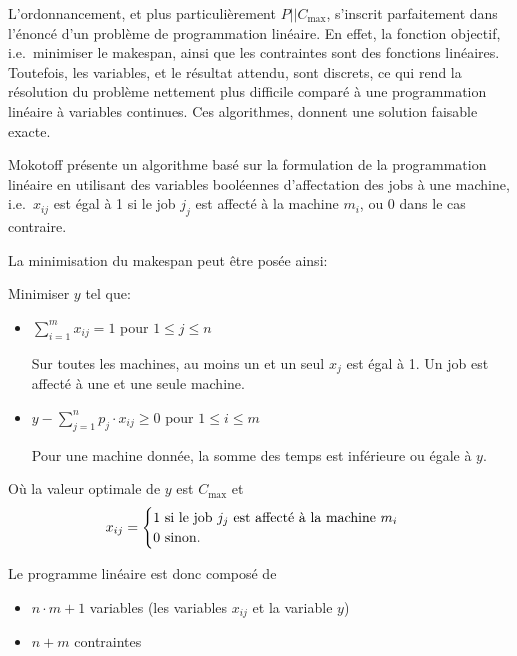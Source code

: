 \documentclass[a4paper,12pt]{report}
\theoremstyle{plain}				%
\theoremstyle{definition}				%
\newcommand\problemGrahamP{$P||C_{\max}$\xspace}
\newcommand{\tdi}[1]{\todo[inline]{{#1}}{}}
\newcommand{\lp}[1]{\todo[author=LP,color=yellow,inline]{#1}}
\begin{document}
L'ordonnancement, et plus particulièrement \problemGrahamP, s'inscrit
parfaitement dans l'énoncé d'un problème de programmation linéaire.
En effet, la fonction objectif, i.e.\ minimiser le makespan, ainsi que
les contraintes sont des fonctions linéaires.
Toutefois, les variables, et le résultat attendu, sont discrets, ce qui
rend la résolution du problème nettement plus difficile comparé à une
programmation linéaire à variables continues.
Ces algorithmes, donnent une solution faisable exacte.


Mokotoff \cite{mokoto1999scheduling} présente un algorithme basé sur
la formulation de la programmation linéaire en utilisant des
variables booléennes d'affectation des jobs à une machine, i.e.\
$x_{ij}$ est égal à 1 si le job $j_j$ est affecté à la machine $m_i$, ou
0 dans le cas contraire.

\bigskip
La minimisation du makespan peut être posée ainsi:

Minimiser $y$ tel que:

\begin{itemize}
\item $\sum_{i=1}^{m}x_{ij}=1$ \quad pour $1 \leq j \leq n$

Sur toutes les machines, au moins un et un seul $x_j$ est égal à 1.
Un job est affecté à une et une seule machine.

\item $y-\sum_{j=1}^{n}p_j \cdot x_{ij} \geq 0$ \quad pour $1 \leq i \leq m$

Pour une machine donnée, la somme des temps est inférieure ou égale à $y$.
\end{itemize}

\bigskip
Où la valeur optimale de $y$ est $C_{\max}$
et
\[
  x_{ij} =
  \begin{cases}
    1 \textnormal{ si le job $j_j$ est affecté à la machine $m_i$}\\
    0 \textnormal{ sinon.}\\
  \end{cases}
\]

Le programme linéaire est donc composé de
\begin{itemize}
\item $n \cdot m + 1$ variables (les variables $x_{ij}$ et la variable $y$)
\item $n+m$ contraintes
\end{itemize}
\end{document}
